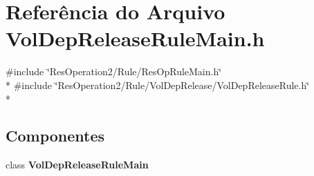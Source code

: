 \section{Referência do Arquivo Vol\+Dep\+Release\+Rule\+Main.\+h}
\label{_2_rule_2_vol_dep_release_2_vol_dep_release_rule_main_8h}
{\ttfamily \#include \char`\"{}Res\+Operation2/\+Rule/\+Res\+Op\+Rule\+Main.\+h\char`\"{}}\\*
{\ttfamily \#include \char`\"{}Res\+Operation2/\+Rule/\+Vol\+Dep\+Release/\+Vol\+Dep\+Release\+Rule.\+h\char`\"{}}\\*
\subsection*{Componentes}
\begin{DoxyCompactItemize}
\item 
class {\bf Vol\+Dep\+Release\+Rule\+Main}
\end{DoxyCompactItemize}
